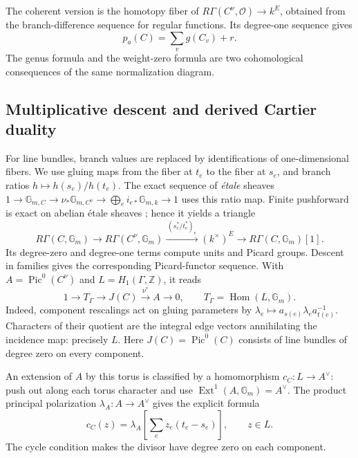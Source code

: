 \documentclass[11pt]{article}
\theoremstyle{definition}
\theoremstyle{remark}
\newcommand{\Z}{\mathbb Z}
\begin{document}
The coherent version is the homotopy fiber of
$R\Gamma(C^\nu,\mathcal O)\to k^E$, obtained from the branch-difference
sequence for regular functions. Its degree-one sequence gives
\[
 p_a(C)=\sum_v g(C_v)+r.
\]
The genus formula and the weight-zero formula are two cohomological
consequences of the same normalization diagram.

\subsection{Multiplicative descent and derived Cartier duality}
\label{sec:graph-generalized-jacobian}

For line bundles, branch values are replaced by identifications of
one-dimensional fibers. We use gluing maps from the fiber at $t_e$ to
the fiber at $s_e$, and branch ratios $h\mapsto h(s_e)/h(t_e)$.
The exact sequence of \emph{\'{e}tale} sheaves
$1\to\mathbb G_{m,C}\to\nu_*\mathbb G_{m,C^\nu}
\to\bigoplus_e i_{e*}\mathbb G_{m,k}\to1$ uses this ratio map.
Finite pushforward is exact on abelian \'{e}tale sheaves
\cite[Proposition 59.55.2]{StacksFiniteEtale}; hence it yields a triangle
\[
 R\Gamma(C,\mathbb G_m)\longrightarrow
 R\Gamma(C^\nu,\mathbb G_m)
 \xrightarrow{\ (s_e^*/t_e^*)_e\ }(k^\times)^E
 \longrightarrow R\Gamma(C,\mathbb G_m)[1].
\]
Its degree-zero and degree-one terms compute units and Picard groups.
Descent in families gives the corresponding Picard-functor sequence.
With $A=\operatorname{Pic}^0(C^\nu)$ and $L=H_1(\Gamma,\Z)$, it reads
\begin{equation}\label{eq:derived-picard-extension}
 1\longrightarrow T_\Gamma\longrightarrow J(C)
 \xrightarrow{\nu^*}A\longrightarrow0,
 \qquad T_\Gamma=\operatorname{Hom}(L,\mathbb G_m).
\end{equation}
Indeed, component rescalings act on gluing parameters by
$\lambda_e\mapsto a_{s(e)}\lambda_e a_{t(e)}^{-1}$. Characters of their
quotient are the integral edge vectors annihilating the incidence map:
precisely $L$. Here $J(C)=\operatorname{Pic}^0(C)$ consists of line bundles
of degree zero on every component.

An extension of $A$ by this torus is classified by a homomorphism
$c_C:L\to A^\vee$: push out along each torus character and use
$\operatorname{Ext}^1(A,\mathbb G_m)=A^\vee$. The product principal
polarization $\lambda_A:A\to A^\vee$ gives the explicit formula
\begin{equation}\label{eq:derived-attachment-map}
 c_C(z)=\lambda_A\left[\sum_e z_e(t_e-s_e)\right],\qquad z\in L.
\end{equation}
The cycle condition makes the divisor have degree zero on each component.
\end{document}
